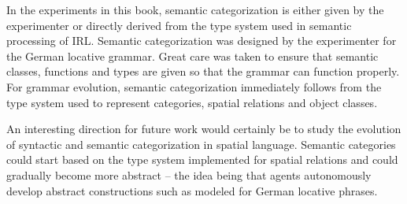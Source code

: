 In the experiments in this book, semantic categorization is either given by the 
experimenter or directly derived from the type system used in semantic processing 
of IRL. Semantic categorization was designed by the experimenter for the 
German locative grammar. Great care was taken to ensure that semantic classes, 
functions and types are given so that the grammar can function properly. For grammar 
evolution, semantic categorization immediately follows from the type system 
used to represent categories, spatial relations and object classes.

An interesting direction for future work would certainly be to study the evolution of
syntactic and semantic categorization in spatial language. Semantic categories 
could start based on the type system implemented for spatial relations and
could gradually become more abstract -- the idea being that agents autonomously 
develop abstract constructions such as modeled for German locative phrases.

%
%
%

%
